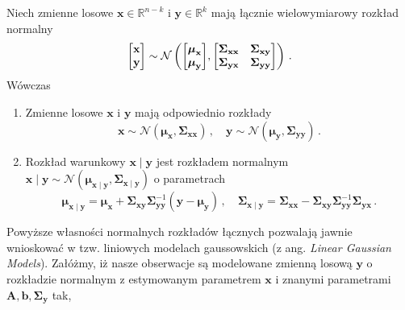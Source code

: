 \documentclass{myclass}
\numberwithin{equation}{subsection}
\begin{document}
\begin{theorem}\label{th:gauss_model}
Niech zmienne losowe \(\mathbf{x} \in \mathbb{R}^{n-k}\) i \(\mathbf{y} \in \mathbb{R}^k\) mają
łącznie wielowymiarowy rozkład normalny
\begin{equation*}
    \mqty[\mathbf{x} \\ \mathbf{y}] \sim \mathcal{N}\left(\mqty[\boldsymbol{\mu}_\mathbf{x} \\ \boldsymbol{\mu}_\mathbf{y}], \mqty[\boldsymbol{\Sigma}_{\mathbf{xx}} & \boldsymbol{\Sigma}_{\mathbf{xy}} \\ \boldsymbol{\Sigma}_{\mathbf{yx}} & \boldsymbol{\Sigma}_{\mathbf{yy}}] \right)\,.
\end{equation*} 
Wówczas
\begin{enumerate}
    
    \item Zmienne losowe \(\mathbf{x}\) i \(\mathbf{y}\) mają odpowiednio rozkłady
    \begin{equation*}
        \mathbf{x} \sim \mathcal{N}(\boldsymbol{\mu}_\mathbf{x}, \boldsymbol{\Sigma}_{\mathbf{xx}})\,,\quad \mathbf{y} \sim \mathcal{N}(\boldsymbol{\mu}_\mathbf{y}, \boldsymbol{\Sigma}_{\mathbf{yy}})\,.
    \end{equation*}

    \item Rozkład warunkowy \(\mathbf{x} \mid \mathbf{y}\) jest rozkładem normalnym \(\mathbf{x}
    \mid \mathbf{y} \sim \mathcal{N}(\boldsymbol{\mu}_{\mathbf{x}\mid\mathbf{y}},
    \boldsymbol{\Sigma}_{\mathbf{x}\mid\mathbf{y}})\) o parametrach
    \begin{equation*}
        \boldsymbol{\mu}_{\mathbf{x}\mid\mathbf{y}} = \boldsymbol{\mu}_\mathbf{x} + \boldsymbol{\Sigma}_\mathbf{xy}\boldsymbol{\Sigma}_\mathbf{yy}^{-1}(\mathbf{y} - \boldsymbol{\mu}_\mathbf{y})\,,\quad \boldsymbol{\Sigma}_{\mathbf{x}\mid\mathbf{y}} = \boldsymbol{\Sigma}_\mathbf{xx} - \boldsymbol{\Sigma}_\mathbf{xy}\boldsymbol{\Sigma}_\mathbf{yy}^{-1}\boldsymbol{\Sigma}_\mathbf{yx}\,.
    \end{equation*}
\end{enumerate}
\end{theorem}
Powyższe własności normalnych rozkładów łącznych pozwalają jawnie wnioskować w tzw. liniowych
modelach gaussowskich (z ang. \textit{Linear Gaussian Models}). Załóżmy, iż nasze obserwacje są
modelowane zmienną losową \(\mathbf{y}\) o rozkładzie normalnym z estymowanym parametrem
\(\mathbf{x}\) i znanymi parametrami \(\mathbf{A}, \mathbf{b}, \boldsymbol{\Sigma}_\mathbf{y}\) tak,
\end{document}
